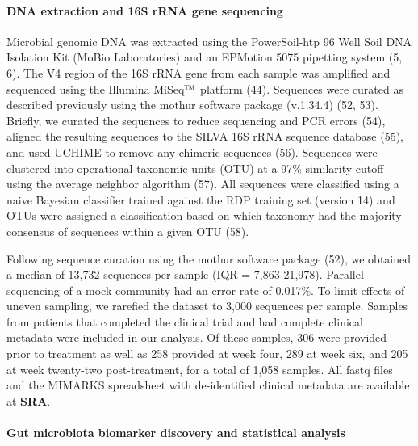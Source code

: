 \documentclass[11pt,]{article}
\let\oldparagraph\paragraph
\renewcommand{\paragraph}[1]{\oldparagraph{#1}\mbox{}}
\begin{document}
\paragraph{DNA extraction and 16S rRNA gene
sequencing}\label{dna-extraction-and-16s-rrna-gene-sequencing}

Microbial genomic DNA was extracted using the PowerSoil-htp 96 Well Soil
DNA Isolation Kit (MoBio Laboratories) and an EPMotion 5075 pipetting
system (5, 6). The V4 region of the 16S rRNA gene from each sample was
amplified and sequenced using the Illumina
MiSeq\(\text{\texttrademark}\) platform (44). Sequences were curated as
described previously using the mothur software package (v.1.34.4) (52,
53). Briefly, we curated the sequences to reduce sequencing and PCR
errors (54), aligned the resulting sequences to the SILVA 16S rRNA
sequence database (55), and used UCHIME to remove any chimeric sequences
(56). Sequences were clustered into operational taxonomic units (OTU) at
a 97\% similarity cutoff using the average neighbor algorithm (57). All
sequences were classified using a naive Bayesian classifier trained
against the RDP training set (version 14) and OTUs were assigned a
classification based on which taxonomy had the majority consensus of
sequences within a given OTU (58).

Following sequence curation using the mothur software package (52), we
obtained a median of 13,732 sequences per sample (IQR = 7,863-21,978).
Parallel sequencing of a mock community had an error rate of 0.017\%. To
limit effects of uneven sampling, we rarefied the dataset to 3,000
sequences per sample. Samples from patients that completed the clinical
trial and had complete clinical metadata were included in our analysis.
Of these samples, 306 were provided prior to treatment as well as 258
provided at week four, 289 at week six, and 205 at week twenty-two
post-treatment, for a total of 1,058 samples. All fastq files and the
MIMARKS spreadsheet with de-identified clinical metadata are available
at \textbf{SRA}.

\paragraph{Gut microbiota biomarker discovery and statistical
analysis}\label{gut-microbiota-biomarker-discovery-and-statistical-analysis}
\end{document}
